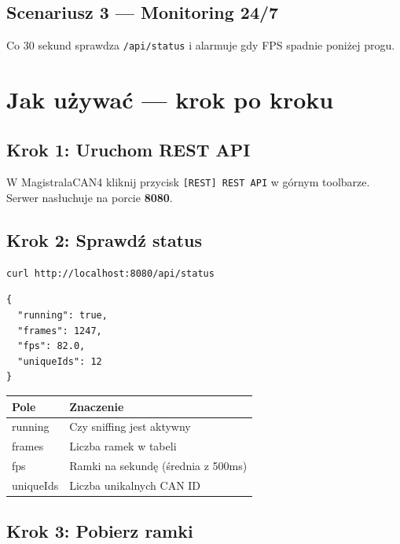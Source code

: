 \documentclass[a4paper,12pt]{article}
\begin{document}
\subsection{Scenariusz 3 — Monitoring 24/7}

Co 30 sekund sprawdza \texttt{/api/status} i alarmuje gdy FPS spadnie poniżej progu.

\section{Jak używać — krok po kroku}

\subsection{Krok 1: Uruchom REST API}

W MagistralaCAN4 kliknij przycisk \texttt{[REST] REST API} w górnym toolbarze. Serwer nasłuchuje na porcie \textbf{8080}.

\subsection{Krok 2: Sprawdź status}

\begin{lstlisting}[style=bash,caption={curl /api/status}]
curl http://localhost:8080/api/status
\end{lstlisting}

\begin{lstlisting}[style=json,caption={Odpowiedź JSON}]
{
  "running": true,
  "frames": 1247,
  "fps": 82.0,
  "uniqueIds": 12
}
\end{lstlisting}

\begin{center}
\begin{tabularx}{0.8\textwidth}{@{}>{\color{accent}\ttfamily}lX@{}}
\toprule\rowcolor{darkbg} Pole & Znaczenie \\\midrule
running & Czy sniffing jest aktywny \\
frames & Liczba ramek w tabeli \\
fps & Ramki na sekundę (średnia z 500ms) \\
uniqueIds & Liczba unikalnych CAN ID \\
\bottomrule
\end{tabularx}
\end{center}

\subsection{Krok 3: Pobierz ramki}
\end{document}
